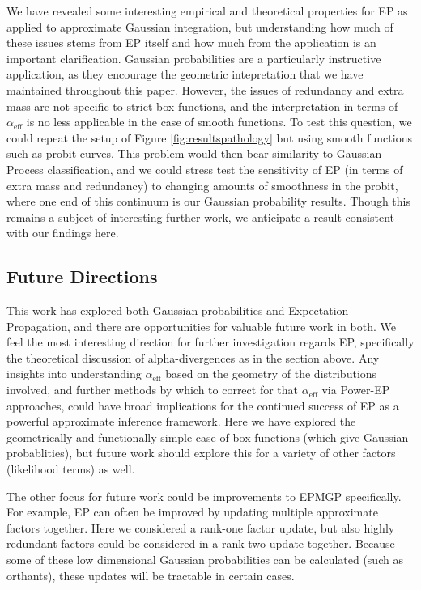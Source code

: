\documentclass[twoside,11pt]{article}
\begin{document}
We have revealed some interesting empirical and theoretical properties for EP as applied to approximate Gaussian integration, but understanding how much of these issues stems from EP itself and how much from the application is an important clarification.   Gaussian probabilities are a particularly instructive application, as they encourage the geometric intepretation that we have maintained throughout this paper.  However, the issues of redundancy and extra mass are not specific to strict box functions, and the interpretation in terms of $\alpha_{\text{eff}}$ is no less applicable in the case of smooth functions.   To test this question, we could repeat the setup of Figure \ref{fig:resultspathology} but using smooth functions such as probit curves.  This problem would then bear similarity to Gaussian Process classification, and we could stress test the sensitivity of EP (in terms of extra mass and redundancy) to changing amounts of smoothness in the probit, where one end of this continuum is our Gaussian probability results.  Though this remains a subject of interesting further work, we anticipate a result consistent with our findings here.


\subsection{Future Directions}

This work has explored both Gaussian probabilities and Expectation Propagation, and there are opportunities for valuable future work in both.  We feel the most interesting direction for further investigation regards EP, specifically the theoretical discussion of alpha-divergences as in the section above.  Any insights into understanding $\alpha_{\text{eff}}$ based on the geometry of the distributions involved, and further methods by which to correct for that $\alpha_{\text{eff}}$ via Power-EP approaches, could have broad implications for the continued success of EP as a powerful approximate inference framework.  Here we have explored the geometrically and functionally simple case of box functions (which give Gaussian probablities), but future work should explore this for a variety of other factors (likelihood terms) as well.

The other focus for future work could be improvements to EPMGP specifically.   For example, EP can often be improved by updating multiple approximate factors together.  Here we considered a rank-one factor update, but also highly redundant factors could be considered in a rank-two update together.  Because some of these low dimensional Gaussian probabilities can be calculated (such as orthants), these updates will be tractable in certain cases. 
\end{document}
